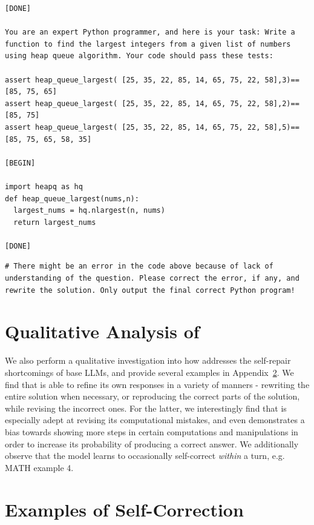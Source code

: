 \begin{appendix}
\begin{lstlisting}[title=MBPP 3-shot Prompt]
[DONE]

You are an expert Python programmer, and here is your task: Write a function to find the largest integers from a given list of numbers using heap queue algorithm. Your code should pass these tests:

assert heap_queue_largest( [25, 35, 22, 85, 14, 65, 75, 22, 58],3)==[85, 75, 65]
assert heap_queue_largest( [25, 35, 22, 85, 14, 65, 75, 22, 58],2)==[85, 75]
assert heap_queue_largest( [25, 35, 22, 85, 14, 65, 75, 22, 58],5)==[85, 75, 65, 58, 35]

[BEGIN]

import heapq as hq
def heap_queue_largest(nums,n):
  largest_nums = hq.nlargest(n, nums)
  return largest_nums

[DONE]
\end{lstlisting}

\begin{lstlisting}[title=MBPP/HumanEval Self-Correction Instruction]
# There might be an error in the code above because of lack of understanding of the question. Please correct the error, if any, and rewrite the solution. Only output the final correct Python program!
\end{lstlisting}


\vspace{-0.2cm}
\section{Qualitative Analysis of \methodname{}}
\vspace{-0.2cm}
We also perform a qualitative investigation into how \methodname{} addresses the self-repair shortcomings of base LLMs, and provide several examples in Appendix~\ref{app:examples}. We find that \methodname{} is able to refine its own responses in a variety of manners - rewriting the entire solution when necessary, or reproducing the correct parts of the solution, while revising the incorrect ones. For the latter, we interestingly find that \methodname{} is especially adept at revising its computational mistakes, and even demonstrates a bias towards showing more steps in certain computations and manipulations in order to increase its probability of producing a correct answer. We additionally observe that the model learns to occasionally self-correct \emph{within} a turn, e.g. MATH example 4.



\section{Examples of \methodname{} Self-Correction}
\label{app:examples}


\end{appendix}

